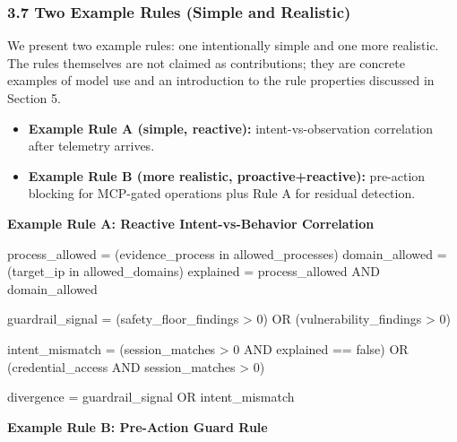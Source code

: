 \documentclass[
]{article}
\newenvironment{Shaded}{}{}
\newcommand{\NormalTok}[1]{#1}
\providecommand{\tightlist}{%
  \setlength{\itemsep}{0pt}\setlength{\parskip}{0pt}}
\begin{document}
\subsubsection{3.7 Two Example Rules (Simple and
Realistic)}\label{two-example-rules-simple-and-realistic}

We present two example rules: one intentionally simple and one more
realistic. The rules themselves are not claimed as contributions; they
are concrete examples of model use and an introduction to the rule
properties discussed in Section 5.

\begin{itemize}
\tightlist
\item
  \textbf{Example Rule A (simple, reactive):} intent-vs-observation
  correlation after telemetry arrives.
\item
  \textbf{Example Rule B (more realistic, proactive+reactive):}
  pre-action blocking for MCP-gated operations plus Rule A for residual
  detection.
\end{itemize}

\textbf{Example Rule A: Reactive Intent-vs-Behavior Correlation}

\begin{Shaded}
\begin{Highlighting}[]
\NormalTok{process\_allowed = (evidence\_process in allowed\_processes)}
\NormalTok{domain\_allowed  = (target\_ip in allowed\_domains)}
\NormalTok{explained       = process\_allowed AND domain\_allowed}

\NormalTok{guardrail\_signal = (safety\_floor\_findings \textgreater{} 0)}
\NormalTok{                OR (vulnerability\_findings \textgreater{} 0)}

\NormalTok{intent\_mismatch  = (session\_matches \textgreater{} 0 AND explained == false)}
\NormalTok{                OR (credential\_access AND session\_matches \textgreater{} 0)}

\NormalTok{divergence = guardrail\_signal OR intent\_mismatch}
\end{Highlighting}
\end{Shaded}

\textbf{Example Rule B: Pre-Action Guard Rule}
\end{document}
